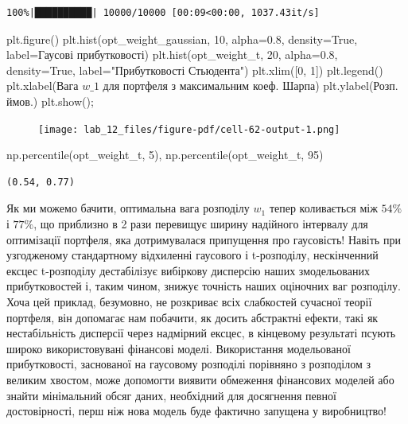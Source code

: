 \documentclass[
  letterpaper,
]{report}
\newenvironment{Shaded}{\begin{snugshade}}{\end{snugshade}}
\newcommand{\DecValTok}[1]{\textcolor[rgb]{0.68,0.00,0.00}{#1}}
\newcommand{\FloatTok}[1]{\textcolor[rgb]{0.68,0.00,0.00}{#1}}
\newcommand{\NormalTok}[1]{\textcolor[rgb]{0.00,0.23,0.31}{#1}}
\newcommand{\OperatorTok}[1]{\textcolor[rgb]{0.37,0.37,0.37}{#1}}
\newcommand{\StringTok}[1]{\textcolor[rgb]{0.13,0.47,0.30}{#1}}
\newcommand{\VariableTok}[1]{\textcolor[rgb]{0.07,0.07,0.07}{#1}}
\begin{document}
\begin{verbatim}
100%|██████████| 10000/10000 [00:09<00:00, 1037.43it/s]
\end{verbatim}

\begin{Shaded}
\begin{Highlighting}[]
\NormalTok{plt.figure()}
\NormalTok{plt.hist(opt\_weight\_gaussian, }\DecValTok{10}\NormalTok{, alpha}\OperatorTok{=}\FloatTok{0.8}\NormalTok{, density}\OperatorTok{=}\VariableTok{True}\NormalTok{, label}\OperatorTok{=}\StringTok{\textquotesingle{}Гаусові прибутковості\textquotesingle{}}\NormalTok{)}
\NormalTok{plt.hist(opt\_weight\_t, }\DecValTok{20}\NormalTok{, alpha}\OperatorTok{=}\FloatTok{0.8}\NormalTok{, density}\OperatorTok{=}\VariableTok{True}\NormalTok{, label}\OperatorTok{=}\StringTok{"Прибутковості Стьюдента"}\NormalTok{)}
\NormalTok{plt.xlim([}\DecValTok{0}\NormalTok{, }\DecValTok{1}\NormalTok{])}
\NormalTok{plt.legend()}
\NormalTok{plt.xlabel(}\StringTok{\textquotesingle{}Вага $w\_1$ для портфеля з максимальним коеф. Шарпа\textquotesingle{}}\NormalTok{)}
\NormalTok{plt.ylabel(}\StringTok{\textquotesingle{}Розп. ймов.\textquotesingle{}}\NormalTok{)}
\NormalTok{plt.show()}\OperatorTok{;}
\end{Highlighting}
\end{Shaded}

\begin{figure}[H]

{\centering \texttt{[image: lab\_12\_files/figure-pdf/cell-62-output-1.png]}

}

\end{figure}

\begin{Shaded}
\begin{Highlighting}[]
\NormalTok{np.percentile(opt\_weight\_t, }\DecValTok{5}\NormalTok{), np.percentile(opt\_weight\_t, }\DecValTok{95}\NormalTok{)}
\end{Highlighting}
\end{Shaded}

\begin{verbatim}
(0.54, 0.77)
\end{verbatim}

Як ми можемо бачити, оптимальна вага розподілу \(w_1\) тепер коливається
між \(54\%\) і \(77\%\), що приблизно в 2 рази перевищує ширину
надійного інтервалу для оптимізації портфеля, яка дотримувалася
припущення про гаусовість! Навіть при узгодженому стандартному
відхиленні гаусового і t-розподілу, нескінченний ексцес t-розподілу
дестабілізує вибіркову дисперсію наших змодельованих прибутковостей і,
таким чином, знижує точність наших оціночних ваг розподілу. Хоча цей
приклад, безумовно, не розкриває всіх слабкостей сучасної теорії
портфеля, він допомагає нам побачити, як досить абстрактні ефекти, такі
як нестабільність дисперсії через надмірний ексцес, в кінцевому
результаті псують широко використовувані фінансові моделі. Використання
модельованої прибутковості, заснованої на гаусовому розподілі порівняно
з розподілом з великим хвостом, може допомогти виявити обмеження
фінансових моделей або знайти мінімальний обсяг даних, необхідний для
досягнення певної достовірності, перш ніж нова модель буде фактично
запущена у виробництво!
\end{document}
